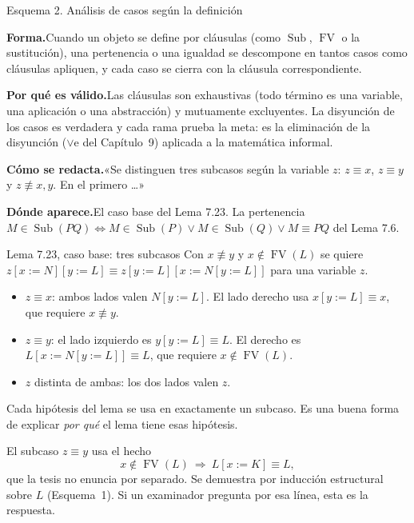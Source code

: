 \documentclass[11pt,a4paper]{article}
\newcommand{\forma}{\par\noindent\textbf{Forma.}\enspace}
\newcommand{\porque}{\par\smallskip\noindent\textbf{Por qué es válido.}\enspace}
\newcommand{\plantilla}{\par\smallskip\noindent\textbf{Cómo se redacta.}\enspace}
\newcommand{\donde}{\par\smallskip\noindent\textbf{Dónde aparece.}\enspace}
\newcommand{\Sub}{\operatorname{Sub}}
\newcommand{\FV}{\operatorname{FV}}
\begin{document}
\begin{esquema}{Esquema 2. Análisis de casos según la definición}
\forma Cuando un objeto se define por cláusulas (como \(\Sub\), \(\FV\) o la
sustitución), una pertenencia o una igualdad se descompone en tantos casos
como cláusulas apliquen, y cada caso se cierra con la cláusula
correspondiente.

\porque Las cláusulas son exhaustivas (todo término es una variable, una
aplicación o una abstracción) y mutuamente excluyentes. La disyunción de los
casos es verdadera y cada rama prueba la meta: es la eliminación de la
disyunción (\(\vee\)e del Capítulo~9) aplicada a la matemática informal.

\plantilla «Se distinguen tres subcasos según la variable \(z\): \(z\equiv x\),
\(z\equiv y\) y \(z\not\equiv x,y\). En el primero \dots»

\donde El caso base del Lema 7.23. La pertenencia
\(M\in\Sub(PQ)\iff M\in\Sub(P)\vee M\in\Sub(Q)\vee M\equiv PQ\) del Lema 7.6.
\end{esquema}

\begin{ejemplotesis}{Lema 7.23, caso base: tres subcasos}
Con \(x\not\equiv y\) y \(x\notin\FV(L)\) se quiere
\(z[x:=N][y:=L]\equiv z[y:=L][x:=N[y:=L]]\) para una variable \(z\).
\begin{itemize}
  \item \(z\equiv x\): ambos lados valen \(N[y:=L]\). El lado derecho usa
    \(x[y:=L]\equiv x\), que requiere \(x\not\equiv y\).
  \item \(z\equiv y\): el lado izquierdo es \(y[y:=L]\equiv L\). El derecho es
    \(L[x:=N[y:=L]]\equiv L\), que requiere \(x\notin\FV(L)\).
  \item \(z\) distinta de ambas: los dos lados valen \(z\).
\end{itemize}
Cada hipótesis del lema se usa en exactamente un subcaso. Es una buena forma
de explicar \emph{por qué} el lema tiene esas hipótesis.
\end{ejemplotesis}

\begin{trampa}
El subcaso \(z\equiv y\) usa el hecho
\[
x\notin\FV(L)\ \Longrightarrow\ L[x:=K]\equiv L,
\]
que la tesis no enuncia por separado. Se demuestra por inducción estructural
sobre \(L\) (Esquema~1). Si un examinador pregunta por esa línea, esta es la
respuesta.
\end{trampa}
\end{document}
